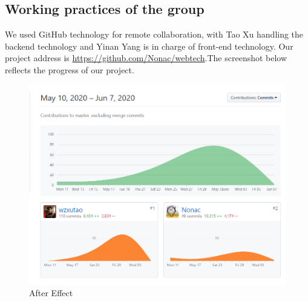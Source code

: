 \documentclass[11pt]{article}
\begin{document}
\begin{spacing}{1.0}
	
	\section{Working practices of the group}
	We used GitHub technology for remote collaboration, with Tao Xu handling the backend technology and Yinan Yang is in charge of front-end technology. Our project address is \href{https://github.com/Nonac/webtech}{https://github.com/Nonac/webtech}.The screenshot below reflects the progress of our project.
	
	\begin{figure}[H]
		\centering
		\includegraphics[scale=0.7]{figures/github.png}
		\caption{After Effect}
		\label{fig:15}
	\end{figure}
	
	
\end{spacing}	
	
\end{document}
